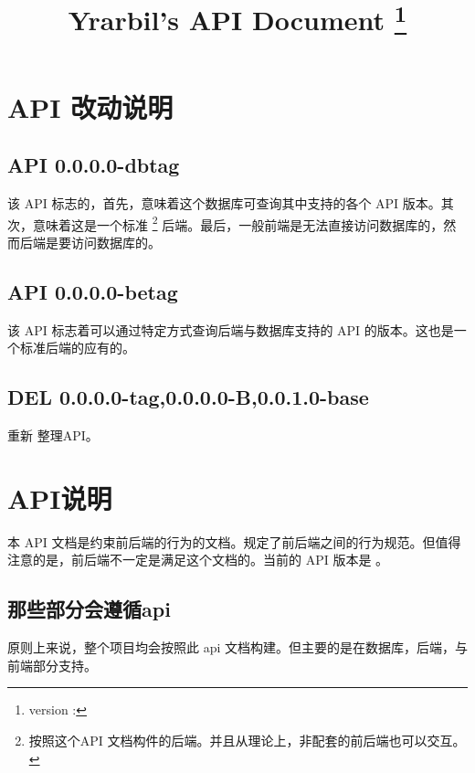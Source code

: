 \documentclass[UTF8]{ctexart}
\title{Yrarbil's API Document \thanks{version : \apiver}}
\begin{document}
    \maketitle
    \newpage
    
    \tableofcontents
    \newpage


    \section{API 改动说明}

    \subsection{API 0.0.0.0-dbtag}
    该 API 标志的，首先，意味着这个数据库可查询其中支持的各个 API 版本。其次，意味着这是一个标准
      \footnote{按照这个API 文档构件的后端。并且从理论上，非配套的前后端也可以交互。}
    后端。最后，一般前端是无法直接访问数据库的，然而后端是要访问数据库的。

    \subsection{API 0.0.0.0-betag}
    该 API 标志着可以通过特定方式查询后端与数据库支持的 API 的版本。这也是一个标准后端的应有的。

    \subsection{DEL 0.0.0.0-tag,0.0.0.0-B,0.0.1.0-base}
    重新 整理API。

    \section{API说明}
    本 API 文档是约束前后端的行为的文档。规定了前后端之间的行为规范。但值得注意的是，前后端不一定是满足这个文档的。当前的 API 版本是 \apiver 。
    \subsection{那些部分会遵循api}
    原则上来说，整个项目均会按照此 api 文档构建。但主要的是在数据库，后端，与前端部分支持。
    

    
    
    
    
    
    
    
    
    
    
\end{document}
